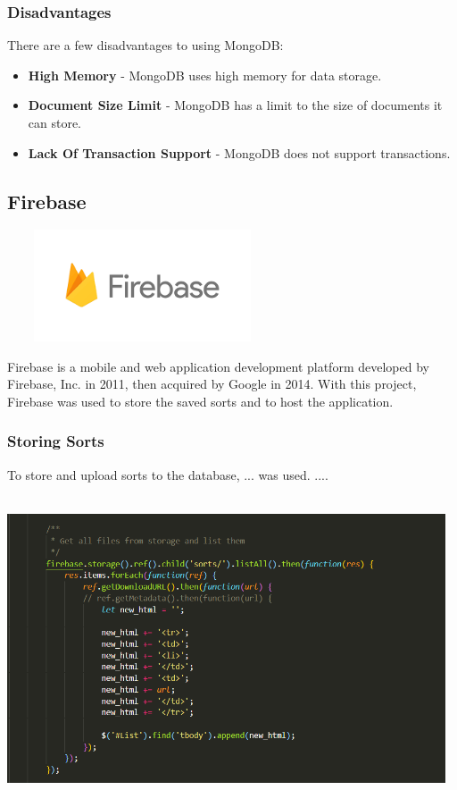 \subsubsection{Disadvantages}
There are a few disadvantages to using MongoDB:

\begin{itemize}
    \item \textbf{High Memory} - MongoDB uses high memory for data storage.
    \item \textbf{Document Size Limit} - MongoDB has a limit to the size of
    documents it can store.
    \item \textbf{Lack Of Transaction Support} - MongoDB does not support
    transactions.
\end{itemize}
\par
\medskip
\par
\medskip

\newpage
\subsection{Firebase}
\par
\medskip
\begin{center}
    \includegraphics[width=8cm,height=3.3cm,keepaspectratio]{images/firebase}
\end{center}
Firebase is a mobile and web application development platform developed by Firebase, Inc. in 2011, then acquired by Google in 2014. With this project, Firebase was used to store the saved sorts and to host the application.

\subsubsection{Storing Sorts}
To store and upload sorts to the database, ... was used. ....

\begin{center}
    \includegraphics[width=13cm,height=9cm,keepaspectratio]{images/storesorts}
\end{center}

